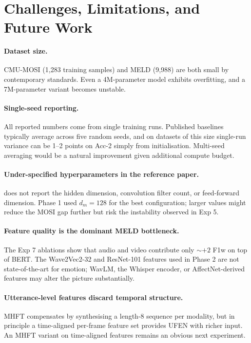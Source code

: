 \documentclass[11pt,twocolumn]{article}
\begin{document}
\section{Challenges, Limitations, and Future Work}
\label{sec:limits}

\paragraph{Dataset size.} CMU-MOSI (1{,}283 training samples) and MELD (9{,}988) are both small by contemporary standards. Even a 4M-parameter model exhibits overfitting, and a 7M-parameter variant becomes unstable.

\paragraph{Single-seed reporting.} All reported numbers come from single training runs. Published baselines typically average across five random seeds, and on datasets of this size single-run variance can be 1--2 points on Acc-2 simply from initialisation. Multi-seed averaging would be a natural improvement given additional compute budget.

\paragraph{Under-specified hyperparameters in the reference paper.} \citet{cai2025multimodal} does not report the hidden dimension, convolution filter count, or feed-forward dimension. Phase 1 used $d_m = 128$ for the best configuration; larger values might reduce the MOSI gap further but risk the instability observed in Exp 5.

\paragraph{Feature quality is the dominant MELD bottleneck.} The Exp 7 ablations show that audio and video contribute only $\sim +2$ F1w on top of BERT. The Wave2Vec2-32 and ResNet-101 features used in Phase 2 are not state-of-the-art for emotion; WavLM, the Whisper encoder, or AffectNet-derived features may alter the picture substantially.

\paragraph{Utterance-level features discard temporal structure.} MHFT compensates by synthesising a length-8 sequence per modality, but in principle a time-aligned per-frame feature set provides UFEN with richer input. An MHFT variant on time-aligned features remains an obvious next experiment.
\end{document}
